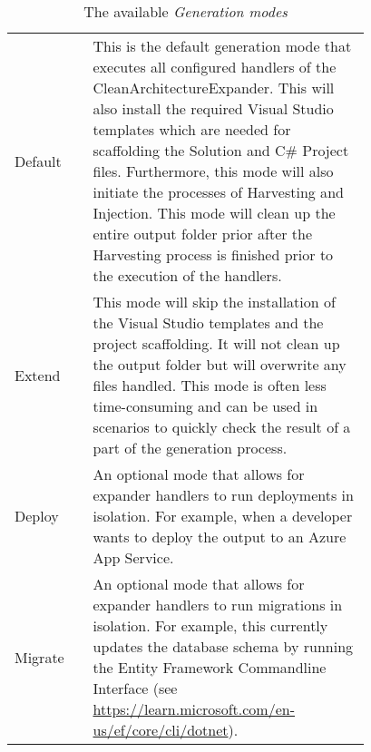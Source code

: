 \begin{table}[H]
    \begin{tabular}{ l | p{0.78\linewidth}}
        \toprule
Default & This is the default generation mode that executes all configured handlers of the
CleanArchitectureExpander. This will also install the required Visual Studio templates
which are needed for scaffolding the Solution and C\# Project files. Furthermore, this
mode will also initiate the processes of Harvesting and Injection. This mode will clean
up the entire output folder prior after the Harvesting process is finished prior to the
execution of the handlers. \\
        
Extend & This mode will skip the installation of the Visual Studio templates and the
project scaffolding. It will not clean up the output folder but will overwrite any files
handled. This mode is often less time-consuming and can be used in scenarios to quickly
check the result of a part of the generation process. \\

Deploy & An optional mode that allows for expander handlers to run deployments in
isolation. For example, when a developer wants to deploy the output to an Azure App
Service. \\
       
Migrate & An optional mode that allows for expander handlers to run migrations in
isolation. For example, this  currently updates the database schema by running the Entity
Framework Commandline Interface (see
\url{https://learn.microsoft.com/en-us/ef/core/cli/dotnet}).\\
        \bottomrule
    \end{tabular}
    \caption{The available \emph{Generation modes}}
    \label{appendix_tab_generation_modes}
\end{table}